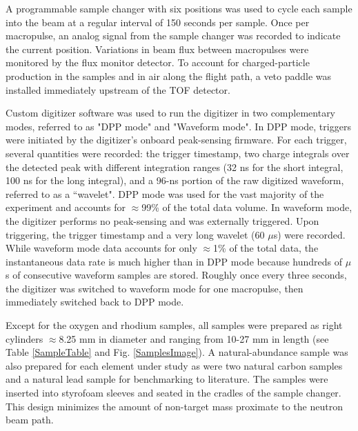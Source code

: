 \documentclass[twocolumn,secnumarabic,amssymb, nobibnotes, aps, prl,
superscriptaddress, nobalancelastpage]{revtex4}
\begin{document}
A programmable sample changer with six positions
was used to cycle each sample into the beam at a regular interval of 150 seconds 
per sample. Once per macropulse, an analog signal from the sample changer was recorded to 
indicate the current position. Variations in beam flux 
between macropulses were monitored by the flux monitor detector. To account for
charged-particle production in the samples and in air along the flight path, a
veto paddle was installed immediately upstream of the TOF detector.

Custom digitizer software was used to run the 
digitizer in two complementary modes, referred to as "DPP mode" and "Waveform 
mode". In DPP mode, triggers were initiated by the digitizer's onboard
peak-sensing firmware. For each trigger, several quantities were recorded: the trigger 
timestamp, two charge integrals over the detected peak with different
integration ranges (32 ns for the short integral, 100 ns for the long integral),
and a 96-ns portion of the raw digitized waveform, referred to as a ``wavelet".
DPP mode was used for the vast majority of the 
experiment and accounts for $\approx$99\% of the total data volume. In waveform mode, 
the digitizer performs no peak-sensing and was externally triggered. Upon 
triggering, the trigger timestamp and a very long wavelet (60 $\mu$s) 
were recorded. While waveform mode data accounts for only $\approx$1\% of the total data, 
the instantaneous data rate is much higher than in DPP 
mode because hundreds of $\mu$s of consecutive waveform samples are 
stored. Roughly once every three seconds, the digitizer was switched to 
waveform mode for one macropulse, then immediately switched back to DPP mode.  

Except for the oxygen and rhodium samples, all samples were prepared as right
cylinders $\approx$8.25 mm in diameter and ranging from 10-27 mm in length (see
Table \ref{SampleTable} and Fig. \ref{SamplesImage}). A natural-abundance sample
was also prepared for each element under study as were two natural carbon
samples and a natural lead sample for benchmarking to literature. The samples
were inserted into styrofoam sleeves and seated in the cradles of the sample
changer. This design minimizes the amount of non-target mass proximate to the
neutron beam path.
\end{document}
